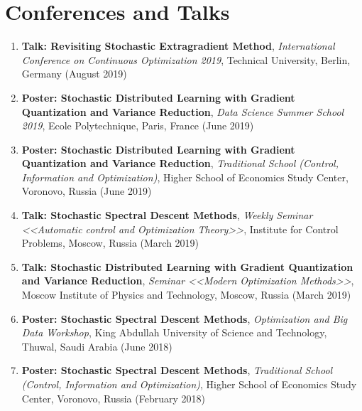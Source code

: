 \section{Conferences and Talks}
\begin{enumerate}
\item {\bf Talk: Revisiting Stochastic Extragradient Method}, {\em International Conference on Continuous Optimization 2019}, Technical University, Berlin, Germany (August 2019)
\item {\bf Poster: Stochastic Distributed Learning with Gradient Quantization and Variance Reduction}, {\em Data Science Summer School 2019}, Ecole Polytechnique, Paris, France (June 2019)
\item {\bf Poster: Stochastic Distributed Learning with Gradient Quantization and Variance Reduction}, {\em Traditional School (Control, Information and Optimization)}, Higher School of Economics Study Center, Voronovo, Russia (June 2019)
\item {\bf Talk: Stochastic Spectral Descent Methods}, {\em Weekly Seminar <<Automatic control and Optimization Theory>>}, Institute for Control Problems, Moscow, Russia (March 2019)
\item {\bf Talk: Stochastic Distributed Learning with Gradient Quantization and Variance Reduction}, {\em Seminar <<Modern Optimization Methods>>}, Moscow Institute of Physics and Technology, Moscow, Russia (March 2019)
\item {\bf Poster: Stochastic Spectral Descent Methods}, {\em Optimization and Big Data Workshop}, King Abdullah University of Science and Technology, Thuwal, Saudi Arabia (June 2018)
\item {\bf Poster: Stochastic Spectral Descent Methods}, {\em Traditional School (Control, Information and Optimization)}, Higher School of Economics Study Center, Voronovo, Russia (February 2018)
\end{enumerate}
